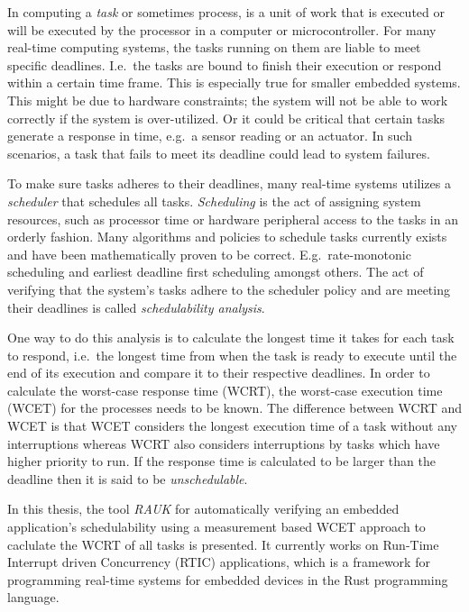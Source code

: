In computing a \emph{task} or sometimes process, is a unit of work that is
executed or will be executed by the processor in a computer or microcontroller.
For many real-time computing systems, the tasks running on them are liable to
meet specific deadlines. I.e.\ the tasks are bound to finish their execution or
respond within a certain time frame. This is especially true for smaller
embedded systems. This might be due to hardware constraints; the system will
not be able to work correctly if the system is over-utilized. Or it could be
critical that certain tasks generate a response in time, e.g.\ a sensor reading
or an actuator. In such scenarios, a task that fails to meet its deadline could
lead to system failures.

To make sure tasks adheres to their deadlines, many real-time systems utilizes
a \emph{scheduler} that schedules all tasks. \emph{Scheduling} is the act of
assigning system resources, such as processor time or hardware peripheral
access to the tasks in an orderly fashion. Many algorithms and policies to
schedule tasks currently exists and have been mathematically proven to be
correct.  E.g.\ rate-monotonic scheduling\cite{ratemonotonic} and earliest
deadline first scheduling\cite{edf} amongst others.  The act of verifying that
the system's tasks adhere to the scheduler policy and are meeting their
deadlines is called \emph{schedulability analysis}.

One way to do this analysis is to calculate the longest time it takes for each
task to respond, i.e.\ the longest time from when the task is ready to execute
until the end of its execution and compare it to their respective deadlines.
In order to calculate the worst-case response time (WCRT), the worst-case
execution time (WCET) for the processes needs to be known. The difference
between WCRT and WCET is that WCET considers the longest execution time of a
task without any interruptions whereas WCRT also considers interruptions by
tasks which have higher priority to run\cite{hardrealtimecomputingsystems}. If
the response time is calculated to be larger than the deadline then it is said
to be \emph{unschedulable}.

In this thesis, the tool \emph{RAUK} for automatically verifying an embedded
application's schedulability using a measurement based WCET approach to
caclulate the WCRT of all tasks is presented. It currently works on
Run-Time Interrupt driven Concurrency (RTIC) applications, which is a framework
for programming real-time systems for embedded devices in the Rust programming
language.

